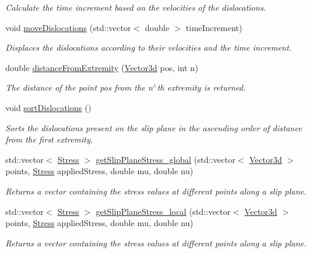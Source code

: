 \begin{DoxyCompactItemize}
\begin{DoxyCompactList}\small\item\em Calculate the time increment based on the velocities of the dislocations. \end{DoxyCompactList}\item 
void \hyperlink{classSlipPlane_a88bc78651af7a440ab41c3d28baea5c0}{move\-Dislocations} (std\-::vector$<$ double $>$ time\-Increment)
\begin{DoxyCompactList}\small\item\em Displaces the dislocations according to their velocities and the time increment. \end{DoxyCompactList}\item 
double \hyperlink{classSlipPlane_a3523030cccb520b5253a811d062f3ddf}{distance\-From\-Extremity} (\hyperlink{classVector3d}{Vector3d} pos, int n)
\begin{DoxyCompactList}\small\item\em The distance of the point pos from the n$^\wedge$th extremity is returned. \end{DoxyCompactList}\item 
void \hyperlink{classSlipPlane_a7fc607c17e5532aed5e93339dc03b18d}{sort\-Dislocations} ()
\begin{DoxyCompactList}\small\item\em Sorts the dislocations present on the slip plane in the ascending order of distance from the first extremity. \end{DoxyCompactList}\item 
std\-::vector$<$ \hyperlink{classStress}{Stress} $>$ \hyperlink{classSlipPlane_a1cc47e2092a588ff04fd14e9ce9e5906}{get\-Slip\-Plane\-Stress\-\_\-global} (std\-::vector$<$ \hyperlink{classVector3d}{Vector3d} $>$ points, \hyperlink{classStress}{Stress} applied\-Stress, double mu, double nu)
\begin{DoxyCompactList}\small\item\em Returns a vector containing the stress values at different points along a slip plane. \end{DoxyCompactList}\item 
std\-::vector$<$ \hyperlink{classStress}{Stress} $>$ \hyperlink{classSlipPlane_ad86337ca356d72f558468a35024e30bc}{get\-Slip\-Plane\-Stress\-\_\-local} (std\-::vector$<$ \hyperlink{classVector3d}{Vector3d} $>$ points, \hyperlink{classStress}{Stress} applied\-Stress, double mu, double nu)
\begin{DoxyCompactList}\small\item\em Returns a vector containing the stress values at different points along a slip plane. \end{DoxyCompactList}\end{DoxyCompactItemize}
